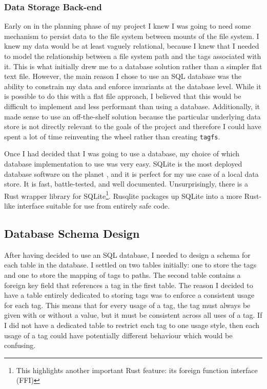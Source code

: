 
\subsubsection{Data Storage Back-end}

Early on in the planning phase of my project I knew I was going to need some
mechanism to persist data to the file system between mounts of the file system.
I knew my data would be at least vaguely relational, because I knew that I
needed to model the relationship between a file system path and the tags
associated with it. This is what initially drew me to a database solution
rather than a simpler flat text file. However, the main reason I chose to use
an SQL database was the ability to constrain my data and enforce invariants at
the database level. While it is possible to do this with a flat file approach,
I believed that this would be difficult to implement and less performant than
using a database.
Additionally, it made sense to use an off-the-shelf solution because the
particular underlying data store is not directly relevant to the goals of the
project and therefore I could have spent a lot of time reinventing the wheel
rather than creating \texttt{tagfs}.

Once I had decided that I was going to use a database, my choice of which
database implementation to use was very easy. SQLite is the most deployed
database software on the planet \cite{sqlite-most-used}, and it is perfect for
my use case of a local data store. It is fast, battle-tested, and well
documented. Unsurprisingly, there is a Rust wrapper library for
SQLite\footnote{This highlights another important Rust feature: its foreign
function interface (FFI)}. Rusqlite packages up SQLite into a more Rust-like
interface suitable for use from entirely safe code. 


\subsection{Database Schema Design}

After having decided to use an SQL database, I needed to design a schema for
each table in the database. I settled on two tables initially: one to store the
tags and one to store the mapping of tags to paths. The second table contains a
foreign key field that references a tag in the first table.
The reason I decided to have a table entirely dedicated to storing tags was to
enforce a consistent usage for each tag. This means that for every usage of a
tag, the tag must always be given with or without a value, but it must be
consistent across all uses of a tag. If I did not have a dedicated table to
restrict each tag to one usage style, then each usage of a tag could have
potentially different behaviour which would be confusing.

